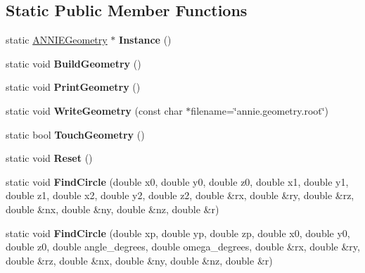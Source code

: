 \subsection*{Static Public Member Functions}
\begin{DoxyCompactItemize}
\item 
\hypertarget{classANNIEGeometry_ac5019e6c5628d0381760a43169b1f69c}{static \hyperlink{classANNIEGeometry}{A\-N\-N\-I\-E\-Geometry} $\ast$ {\bfseries Instance} ()}\label{classANNIEGeometry_ac5019e6c5628d0381760a43169b1f69c}

\item 
\hypertarget{classANNIEGeometry_ad5cc6f1a59adcc81ed32baf70fffe80a}{static void {\bfseries Build\-Geometry} ()}\label{classANNIEGeometry_ad5cc6f1a59adcc81ed32baf70fffe80a}

\item 
\hypertarget{classANNIEGeometry_a263767eee59a5cf354f3f78ff11efe15}{static void {\bfseries Print\-Geometry} ()}\label{classANNIEGeometry_a263767eee59a5cf354f3f78ff11efe15}

\item 
\hypertarget{classANNIEGeometry_ae6ac4bbd93009837fb6dd876eec7a558}{static void {\bfseries Write\-Geometry} (const char $\ast$filename=\char`\"{}annie.\-geometry.\-root\char`\"{})}\label{classANNIEGeometry_ae6ac4bbd93009837fb6dd876eec7a558}

\item 
\hypertarget{classANNIEGeometry_a1bb496b1b3f0f3ef86a76dc59571beb7}{static bool {\bfseries Touch\-Geometry} ()}\label{classANNIEGeometry_a1bb496b1b3f0f3ef86a76dc59571beb7}

\item 
\hypertarget{classANNIEGeometry_a8d2c6faa5bdc504fb70967551ad59068}{static void {\bfseries Reset} ()}\label{classANNIEGeometry_a8d2c6faa5bdc504fb70967551ad59068}

\item 
\hypertarget{classANNIEGeometry_a6de654c497e0f352fc293cfc87246a0f}{static void {\bfseries Find\-Circle} (double x0, double y0, double z0, double x1, double y1, double z1, double x2, double y2, double z2, double \&rx, double \&ry, double \&rz, double \&nx, double \&ny, double \&nz, double \&r)}\label{classANNIEGeometry_a6de654c497e0f352fc293cfc87246a0f}

\item 
\hypertarget{classANNIEGeometry_ab8f9b0fa3e34b1524146e536cb0d61b8}{static void {\bfseries Find\-Circle} (double xp, double yp, double zp, double x0, double y0, double z0, double angle\-\_\-degrees, double omega\-\_\-degrees, double \&rx, double \&ry, double \&rz, double \&nx, double \&ny, double \&nz, double \&r)}\label{classANNIEGeometry_ab8f9b0fa3e34b1524146e536cb0d61b8}


\end{DoxyCompactItemize}
